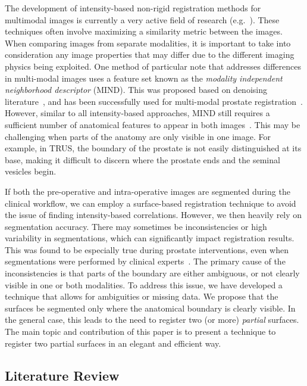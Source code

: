 \documentclass[journal]{IEEEtran}
\begin{document}
The development of intensity-based non-rigid registration methods for multimodal images is currently a very active field of research (e.g.~\cite{Pluim03a,Sotiras13a}).  These techniques often involve maximizing a similarity metric between the images.  When comparing images from separate modalities, it is important to take into consideration any image properties that may differ due to the different imaging physics being exploited.  One method of particular note that addresses differences in multi-modal images uses a feature set known as the \textit{modality independent neighborhood descriptor} (MIND).  This was proposed based on denoising literature~\cite{Heinrich12a}, and has been successfully used for multi-modal prostate registration~\cite{Sun13a}. However, similar to all intensity-based approaches, MIND still requires a sufficient number of anatomical features to appear in both images~\cite{Heinrich12a}. This may be challenging when parts of the anatomy are only visible in one image. For example, in TRUS, the boundary of the prostate is not easily distinguished at its base, making it difficult to discern where the prostate ends and the seminal vesicles begin.

If both the pre-operative and intra-operative images are segmented during the clinical workflow, we can employ a surface-based registration technique to avoid the issue of finding intensity-based correlations. However, we then heavily rely on segmentation accuracy.  There may sometimes be inconsistencies or high variability in segmentations, which can significantly impact registration results.  This was found to be especially true during prostate interventions, even when segmentations were performed by clinical experts~\cite{Smith07a}. The primary cause of the inconsistencies is that parts of the boundary are either ambiguous, or not clearly visible in one or both modalities.  To address this issue, we have developed a technique that allows for ambiguities or missing data.  We propose that the surfaces be segmented only where the anatomical boundary is clearly visible.  In the general case, this leads to the need to register two (or more) \textit{partial} surfaces.  The main topic and contribution of this paper is to present a technique to register two partial surfaces in an elegant and efficient way.

\subsection{Literature Review}
\end{document}
